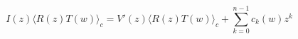 \begin{equation}
I(z) \langle R(z) T(w) \rangle_c= V'(z) \langle R(z) T(w) \rangle_c +
\sum_{k=0}^{n-1} c_k(w) z^k
\end{equation}

